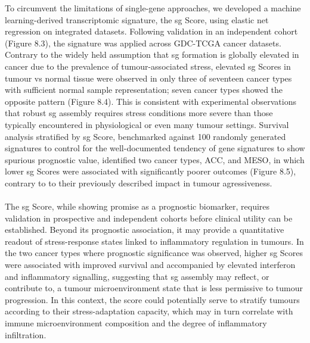 To circumvent the limitations of single-gene approaches, we developed a machine learning-derived transcriptomic signature, the \gls{sg} Score, using elastic net regression on integrated datasets\cite{matheny_transcriptome-wide_2019, matheny_rna_2021, matheny_corrigendum_2023}. Following validation in an independent cohort\cite{paget_stress_2023} (Figure 8.3), the signature was applied across GDC-TCGA cancer datasets\cite{network_cancer_nodate, heath_nci_2021}. Contrary to the widely held assumption that \gls{sg} formation is globally elevated in cancer due to the prevalence of tumour-associated stress\cite{anderson_stress_2015}, elevated \gls{sg} Scores in tumour \gls{vs} normal tissue were observed in only three of seventeen cancer types with sufficient normal sample representation; seven cancer types showed the opposite pattern (Figure 8.4). This is consistent with experimental observations that robust \gls{sg} assembly requires stress conditions more severe than those typically encountered in physiological or even many tumour settings\cite{glauninger_stressful_2022}.
Survival analysis stratified by \gls{sg} Score, benchmarked against 100 randomly generated signatures to control for the well-documented tendency of gene signatures to show spurious prognostic value\cite{venet_most_2011, shimoni_association_2018}, identified two cancer types, ACC, and MESO, in which lower \gls{sg} Scores were associated with significantly poorer outcomes (Figure 8.5), contrary to to their previously described impact in tumour agressiveness\cite{somasekharan_yb-1_2015, fonteneau_stress_2022, grabocka_mutant_2016}.
\\
\\
The \gls{sg} Score, while showing promise as a prognostic biomarker, requires validation in prospective and independent cohorts before clinical utility can be established. Beyond its prognostic association, it may provide a quantitative readout of stress-response states linked to inflammatory regulation in tumours. In the two cancer types where prognostic significance was observed, higher \gls{sg} Scores were associated with improved survival and accompanied by elevated interferon and inflammatory signalling, suggesting that \gls{sg} assembly may reflect, or contribute to, a tumour microenvironment state that is less permissive to tumour progression. In this context, the score could potentially serve to stratify tumours according to their stress-adaptation capacity, which may in turn correlate with immune microenvironment composition and the degree of inflammatory infiltration.
